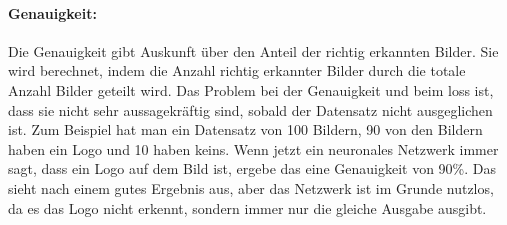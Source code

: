 \documentclass[12pt,a4paper]{report}
\begin{document}
\paragraph{Genauigkeit:} Die Genauigkeit gibt Auskunft über den Anteil der richtig erkannten Bilder.
Sie wird berechnet, indem die Anzahl richtig erkannter Bilder durch die totale Anzahl Bilder geteilt wird.
Das Problem bei der Genauigkeit und beim loss ist, dass sie nicht sehr aussagekräftig sind,
sobald der Datensatz nicht ausgeglichen ist.
Zum Beispiel hat man ein Datensatz von 100 Bildern, 90 von den Bildern haben ein Logo und 10 haben keins.
Wenn jetzt ein neuronales Netzwerk immer sagt, dass ein Logo auf dem Bild ist, ergebe das eine Genauigkeit von 90\%.
Das sieht nach einem gutes Ergebnis aus, aber das Netzwerk ist im Grunde nutzlos, da es das Logo nicht erkennt,
sondern immer nur die gleiche Ausgabe ausgibt.
\end{document}
